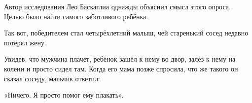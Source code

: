 Автор исследования Лео Баскаглиа однажды объяснил смысл этого опроса. Целью было найти самого заботливого ребёнка. 

Так вот, победителем стал четырёхлетний малыш, чей старенький сосед недавно потерял жену.

Увидев, что мужчина плачет, ребёнок зашёл к нему во двор, залез к нему на
колени и просто сидел там. Когда его мама позже спросила, что же такого он
сказал соседу, мальчик ответил:

«Ничего. Я просто помог ему плакать».
